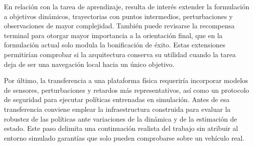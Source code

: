 En relación con la tarea de aprendizaje, resulta de interés extender la
formulación a objetivos dinámicos, trayectorias con puntos intermedios,
perturbaciones y observaciones de mayor complejidad. También puede revisarse la
recompensa terminal para otorgar mayor importancia a la orientación final, que
en la formulación actual solo modula la bonificación de éxito. Estas extensiones
permitirían comprobar si la arquitectura conserva su utilidad cuando la tarea
deja de ser una navegación local hacia un único objetivo.

Por último, la transferencia a una plataforma física requeriría incorporar
modelos de sensores, perturbaciones y retardos más representativos, así como un
protocolo de seguridad para ejecutar políticas entrenadas en simulación. Antes de
esa transferencia conviene emplear la infraestructura construida para evaluar la
robustez de las políticas ante variaciones de la dinámica y de la estimación de
estado. Este paso delimita una continuación realista del trabajo sin atribuir al
entorno simulado garantías que solo pueden comprobarse sobre un vehículo real.
